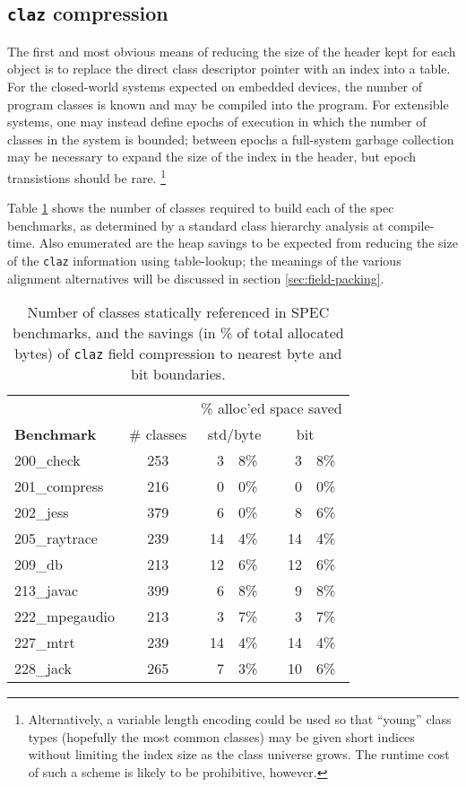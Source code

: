 \documentclass[preprint]{acmconf}
\begin{document}
\subsection{{\tt claz} compression}
The first and most obvious means of reducing the size of the header
kept for each object is to replace the direct class descriptor
pointer with an index into a table.  For the closed-world systems
expected on embedded devices, the number of program classes is known
and may be compiled into the program.  For extensible systems, one may
instead define epochs of execution in which the number of classes
in the system is bounded; between epochs a full-system garbage
collection may be necessary to expand the size of the index in the
header, but epoch transistions should be rare.%
\footnote{Alternatively, a
variable length encoding could be used so that ``young'' class types
(hopefully the most common classes) may be given short indices without
limiting the index size as the class universe grows.  The runtime cost
of such a scheme is likely to be prohibitive, however.}

Table \ref{tab:claz-space} shows the number of classes required to
build each of
the spec benchmarks, as determined by a standard class hierarchy
analysis at compile-time.  Also enumerated are the heap savings to be
expected from reducing the size of the {\tt claz} information using
table-lookup; the meanings of the various alignment alternatives will
be discussed in section \ref{sec:field-packing}.
\begin{table}
\begin{tabular}{lcr@{.}lr@{.}l}
&& \multicolumn{4}{c}{\% alloc'ed space saved} \\
\bf Benchmark & \# classes & \multicolumn{2}{c}{std/byte} &
                             \multicolumn{2}{l}{~~bit} \\ \hline
200\_check	& 253 &  3&8\% &  3&8\% \\
201\_compress	& 216 &  0&0\% &  0&0\% \\
202\_jess	& 379 &  6&0\% &  8&6\% \\
205\_raytrace	& 239 & 14&4\% & 14&4\% \\
209\_db 	& 213 & 12&6\% & 12&6\% \\
213\_javac	& 399 &  6&8\% &  9&8\% \\
222\_mpegaudio	& 213 &  3&7\% &  3&7\% \\
227\_mtrt	& 239 & 14&4\% & 14&4\% \\
228\_jack	& 265 &  7&3\% & 10&6\% \\
\end{tabular}
\caption{Number of classes statically referenced in SPEC benchmarks,
  and the savings (in \% of total allocated bytes) of {\tt claz} field
  compression to nearest byte and bit boundaries.}
\label{tab:claz-space}
\end{table}
\end{document}
